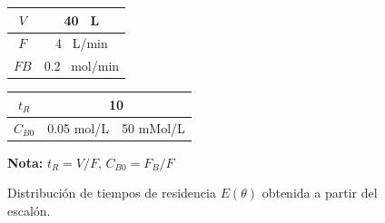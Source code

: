 \begin{figure}[htbp]
    \centering
    \begin{minipage}{0.4\textwidth}
        \centering
        \begin{tabular}{|c|c|}
            \hline
            \rowcolor{orange!20} \textbf{$V$}  & 40 \, \si{L}        \\ \hline
            \rowcolor{orange!20} \textbf{$F$}  & 4 \, \si{L/min}     \\ \hline
            \rowcolor{orange!20} \textbf{$FB$} & 0.2 \, \si{mol/min} \\ \hline
        \end{tabular}
        \caption{Datos dados por el enunciado del problema.}
        \vspace{0.5cm}
        \begin{tabular}{|c|c|c|}
            \hline
            \rowcolor{orange!20} \textbf{$t_R$}    & \multicolumn{2}{c|}{10}                  \\ \hline
            \rowcolor{orange!20} \textbf{$C_{B0}$} & 0.05 \si{mol/L}         & 50 \si{mMol/L} \\ \hline
        \end{tabular}
        \vspace{0.2cm}
        \caption{Parámetros del experimento.}
        \vspace{0.3cm}
        \textbf{Nota:} $t_R = V/F$, $C_{B0} = F_{B}/F$
    \end{minipage}
    \hfill
    \begin{minipage}{0.55\textwidth}
        \centering
    \end{minipage}
    \caption{Distribución de tiempos de residencia $E(\theta)$ obtenida a partir del escalón.}
\end{figure}
\newpage
